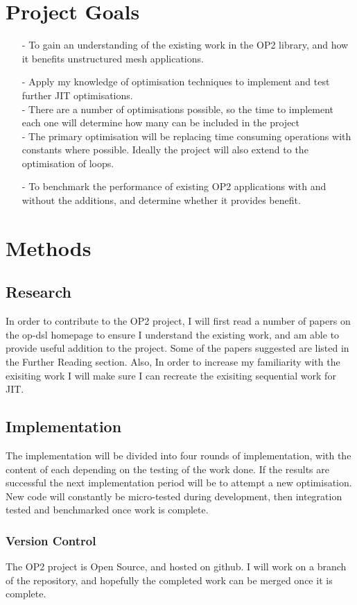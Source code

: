 \documentclass[11pt]{article}
\begin{document}
\section*{Project Goals}
 \begin{itemize}
  \item[-]{To gain an understanding of the existing work in the OP2 library, and how it benefits unstructured mesh applications.}
  \item[-]{Apply my knowledge of optimisation techniques to implement and test further JIT optimisations.}\\
- There are a number of optimisations possible, so the time to implement each one will determine how many can be included in the project
\\
- The primary optimisation will be replacing time consuming operations with constants where possible. Ideally the project will also extend to the optimisation of loops.
  \item[-]{To benchmark the performance of existing OP2 applications with and without the additions, and determine whether it provides benefit.}
 \end{itemize}
\section*{Methods}
\subsection*{Research}
In order to contribute to the OP2 project, I will first read a number of papers on the op-dsl homepage to ensure I understand the existing work, and am able to provide useful addition to the project. Some of the papers suggested are listed in the Further Reading section. Also, In order to increase my familiarity with the exisiting work I will make sure I can recreate the exisiting sequential work for JIT.
\subsection*{Implementation}
The implementation will be divided into four rounds of implementation, with the content of each depending on the testing of the work done. If the results are successful the next implementation period will be to attempt a new optimisation. New code will constantly be micro-tested during development, then integration tested and benchmarked once work is complete.
\subsubsection*{Version Control}
The OP2 project is Open Source, and hosted on github. I will work on a branch of the repository, and hopefully the completed work can be merged once it is complete.
\end{document}
